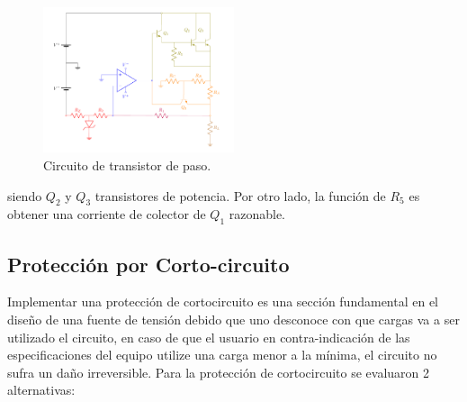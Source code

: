 \begin{figure}[H]
\centering
	\includegraphics[width=0.5\textwidth, page=5]{ImagenesEjercicio2/Regulador.pdf}
	\caption{Circuito de transistor de paso.}
	\label{fig:transistorDePaso}
\end{figure}
siendo $Q_2$ y $Q_3$ transistores de potencia. Por otro lado, la función de $R_5$ es obtener una corriente de colector de $Q_1$ razonable.

\subsection{Protección por Corto-circuito}
Implementar una protección de cortocircuito es una sección fundamental en el diseño de una fuente de tensión debido que uno desconoce con que cargas va  a ser utilizado el circuito, en caso de que el usuario en contra-indicación de las especificaciones del equipo utilize una carga menor a la mínima, el circuito no sufra un daño irreversible. 
Para la protección de cortocircuito se evaluaron 2 alternativas:
